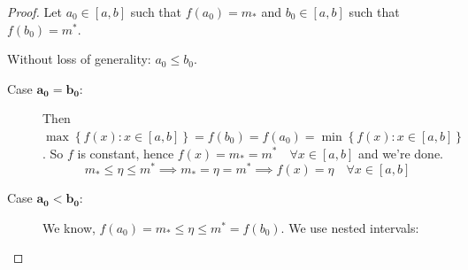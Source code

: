 \documentclass[a4paper,landscape,twocolumn]{article}
\theoremstyle{definition}
\newcommand\set[1]{\left\{#1\right\}}
\begin{document}
\begin{proof}
  Let $a_0 \in [a, b]$ such that $f(a_0) = m_*$ and $b_0 \in [a, b]$ such that $f(b_0) = m^*$.
  
  Without loss of generality: $a_0 \leq b_0$.
  \begin{description}
    \item[Case $\mathbf{a_0 = b_0}$:]
      Then $\max\set{f(x): x \in [a,b]} = f(b_0) = f(a_0) = \min\set{f(x): x \in [a, b]}$.
      So $f$ is constant, hence $f(x) = m_* = m^* \quad\forall x \in [a, b]$ and we're done.
      \[ m_* \leq \eta \leq m^* \implies m_* = \eta = m^* \implies f(x) = \eta \quad\forall x \in [a,b] \]
    \item[Case $\mathbf{a_0 < b_0}$:]
      We know, $f(a_0) = m_* \leq \eta \leq m^* = f(b_0)$.
      We use nested intervals:


\end{description}
\end{proof}
\end{document}
